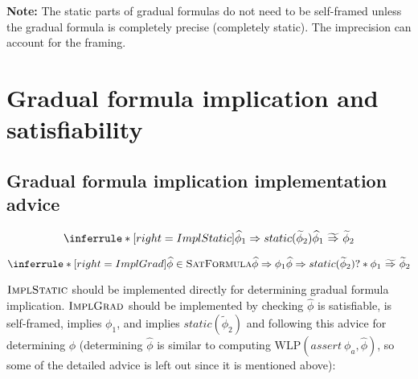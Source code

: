 \documentclass {article}
\newcommand{\fphi}{\widehat{\phi}}
\newcommand{\tphi}{\widetilde{\phi}}
\newcommand{\imp}{\Rightarrow}
\newcommand{\timp}{\ \widetilde{\Rightarrow}\ }
\newcommand{\wlp}[2]{\text{WLP}(#1,#2)}
\newcommand{\satdef}{\textsc{SatFormula}}
\newcommand{\implsdef}{\textsc{ImplStatic}}
\newcommand{\implgdef}{\textsc{ImplGrad}}
\begin{document}
\textbf{Note:} The static parts of gradual formulas do not need to be self-framed unless the gradual formula is completely precise (completely static). The imprecision can account for the framing.

\section{Gradual formula implication and satisfiability}

\subsection{Gradual formula implication implementation advice}

\[ \inferrule*[right=ImplStatic]
   {\fphi_1 \imp static(\tphi_2) }
   {\fphi_1 \timp \tphi_2}
\]

\[
\inferrule*[right=ImplGrad]
   {\fphi \in \satdef \\ \fphi \imp \phi_1 \\ \fphi \imp static(\tphi_2)}
   {? \ast \phi_1 \timp \tphi_2}
\]

$\implsdef$ should be implemented directly for determining gradual formula implication. $\implgdef$ should be implemented by checking $\fphi$ is satisfiable, is self-framed, implies $\phi_1$, and implies $static(\tphi_2)$ and following this advice for determining $\fphi$ (determining $\fphi$ is similar to computing $\wlp{assert\ \phi_a}{\fphi}$, so some of the detailed advice is left out since it is mentioned above):
\end{document}
